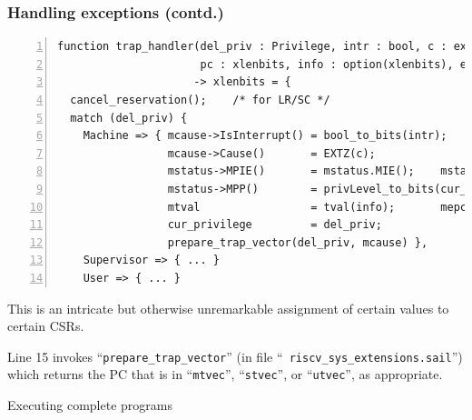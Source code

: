 \documentclass[aspectratio=169]{beamer}
\newcommand{\slidefont}{\scriptsize}
\newcommand{\cf}{\scriptsize\tt}
\begin{document}
\begin{frame}[fragile]
  \frametitle{Handling exceptions (contd.)}

  \slidefont

  \begin{Verbatim}[frame=single, numbers=left, label = File riscv\_sys\_control.sail]
function trap_handler(del_priv : Privilege, intr : bool, c : exc_code,
                      pc : xlenbits, info : option(xlenbits), ext : option(ext_exception))
                     -> xlenbits = {
  cancel_reservation();    /* for LR/SC */
  match (del_priv) {
    Machine => { mcause->IsInterrupt() = bool_to_bits(intr);
                 mcause->Cause()       = EXTZ(c);
                 mstatus->MPIE()       = mstatus.MIE();    mstatus->MIE() = 0b0;
                 mstatus->MPP()        = privLevel_to_bits(cur_privilege);
                 mtval                 = tval(info);       mepc           = pc;
                 cur_privilege         = del_priv;
                 prepare_trap_vector(del_priv, mcause) },
    Supervisor => { ... }
    User => { ... }
  \end{Verbatim}

  \begin{minipage}{\textwidth}
    This is an intricate but otherwise unremarkable assignment of certain values to certain CSRs.

    \vspace{1ex}

    Line 15 invokes ``{\cf prepare\_trap\_vector}'' (in file ``{\cf
      riscv\_sys\_extensions.sail}'') which returns the PC that is in
    ``{\cf mtvec}'', ``{\cf stvec}'', or ``{\cf utvec}'', as appropriate.

  \end{minipage}

\end{frame}


\begin{frame}

  \slidefont

  \vfill

  \begin{center}\LARGE
    Executing complete programs
  \end{center}

  \vfill

\end{frame}

\end{document}

